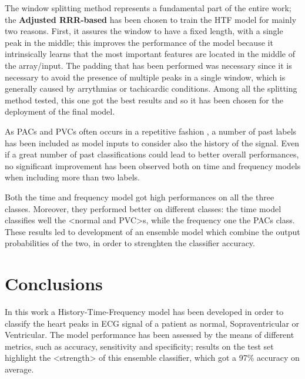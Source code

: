 \documentclass[conference]{IEEEtran}
\begin{document}
    The window splitting method represents a fundamental part of the entire
    work; the \textbf{Adjusted RRR-based} has been chosen to train the HTF model for mainly two reasons.
    First, it assures the window to have a fixed length, with a single peak in
    the middle; this improves the performance of the model because it intrinsically learns that the 
    most important features are located in the middle of the array/input.
    The padding that has been performed was necessary since it is necessary to
    avoid the presence of multiple peaks in a single window, which is generally
    caused by arrythmias or tachicardic conditions. Among  all the 
    splitting method tested, this one got the best results and so it has been 
    chosen for the deployment of the final model. 

    As PACs and PVCs often occurs in a repetitive fashion \cite{premature_v}, a number of past
    labels has been included as model inputs to consider also the history 
    of the signal. Even if a great number of
    past classifications could lead to better overall performances, no
    significant improvement has been observed both on time and frequency 
    models when including more than two labels.
    
    Both the time and frequency model got high performances on all the three 
    classes. Moreover, they performed better on different classes: the time 
    model classifies well the <normal and PVC>s, 
    while the frequency one the PACs class. These results led to development 
    of an ensemble model which combine the output probabilities of the two, 
    in order to strenghten the classifier accuracy. 

\section{Conclusions}
    In this work a History-Time-Frequency model has been developed in order 
    to classify the heart peaks in ECG signal of a patient as normal,
    Sopraventricular or Ventricular. 
    The model performance has been assessed by the means of different metrics, 
    such as accuracy, sensitivity and specificity; results on the test set 
    highlight the <strength> of this ensemble classifier, which got a 97\%
    accuracy on average.
    \vfill\null



\newpage
\onecolumn
\appendices
\end{document}
